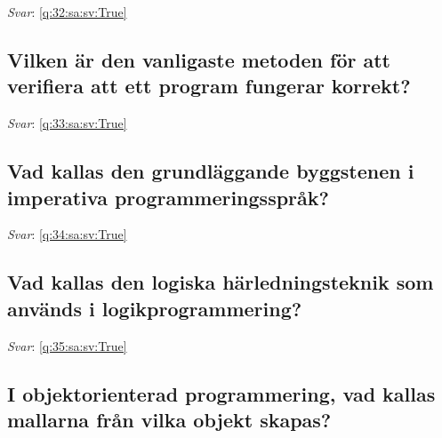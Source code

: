 \documentclass[a4paper,11pt,oneside]{article}
\begin{document}
\begin{sloppypar}
\noindent\makebox[\textwidth]{\hrulefill}

\vspace{1cm}

\textit{Svar}: \autoref{q:32:sa:sv:True}



\subsection{Vilken \"ar den vanligaste metoden f\"or att verifiera att ett program fungerar korrekt?}

\label{q:33:sa:sv:False}

\vspace{2cm}

\noindent\makebox[\textwidth]{\hrulefill}

\vspace{1cm}

\textit{Svar}: \autoref{q:33:sa:sv:True}



\subsection{Vad kallas den grundl\"aggande byggstenen i imperativa programmeringsspr\r{a}k?}

\label{q:34:sa:sv:False}

\vspace{2cm}

\noindent\makebox[\textwidth]{\hrulefill}

\vspace{1cm}

\textit{Svar}: \autoref{q:34:sa:sv:True}



\subsection{Vad kallas den logiska h\"arledningsteknik som anv\"ands i logikprogrammering?}

\label{q:35:sa:sv:False}

\vspace{2cm}

\noindent\makebox[\textwidth]{\hrulefill}

\vspace{1cm}

\textit{Svar}: \autoref{q:35:sa:sv:True}



\subsection{I objektorienterad programmering, vad kallas mallarna fr\r{a}n vilka objekt skapas?}


\end{sloppypar}
\end{document}
